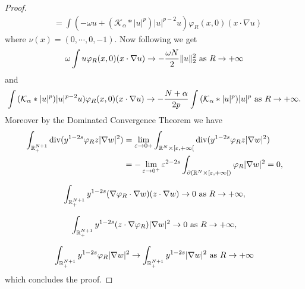 \documentclass[10pt]{amsart}
\numberwithin{equation}{section}
\begin{document}
\begin{proof}
\begin{align*}
	&=
	\int (-\omega u+ {{(\mathcal K_{\alpha}*|u|^{p})}} |u|^{p-2}u)\varphi_{R}(x,0)(x\cdot\nabla u)
	\end{align*}
	where $\nu(x)=(0,\cdots,0,-1)$. Now  following \cite[Proof of Proposition 3.1]{MV} we get
	\[
	\omega \int u \varphi_{R}(x,0)(x\cdot\nabla u)
	\to
	-\frac{\omega N}{2} \|u\|_2^2
	\hbox{ as } R\to +\infty
	\]
	and
	\[
	\int {{(\mathcal K_{\alpha}*|u|^{p})}} |u|^{p-2}u)\varphi_{R}(x,0)(x\cdot\nabla u)
	\to
	-\frac{N+\alpha}{2p} \int {{(\mathcal K_{\alpha}*|u|^{p})}} |u|^{p}
	\hbox{ as } R\to +\infty.
	\]
	Moreover by the Dominated Convergence Theorem we have
\begin{align*} 
\int_{\mathbb R^{N+1}_{+}} 
{\rm div}(y^{1-2s} \varphi_{ R} z |\nabla w|^{2})
&=
\lim_{\varepsilon\to 0+}
\int_{\mathbb R^{N}\times[\varepsilon,+\infty[} 
{\rm div}(y^{1-2s} \varphi_{ R} z |\nabla w|^{2})\\
&=
-\lim_{\varepsilon\to 0^{+}}
\varepsilon^{2-2s}
\int_{\partial({{\mathbb R}}^N\times[{\varepsilon},+\infty[)}
\varphi_{ R} |\nabla w|^{2} =0,
\end{align*}

\[
\int_{\mathbb R^{N+1}_{+}} 
y^{1-2s}(\nabla\varphi_{R}\cdot\nabla w)(z\cdot\nabla w)
\to 0
\hbox{ as } R\to +\infty,
\]

\[
\int_{\mathbb R^{N+1}_{+}} 
y^{1-2s}(z\cdot\nabla\varphi_{R})|\nabla w|^2
\to 0
\hbox{ as } R\to +\infty,
\]

\[
\int_{\mathbb R^{N+1}_{+}} 
y^{1-2s}\varphi_{R} |\nabla w|^2
\to 
\int_{\mathbb R^{N+1}_{+}} 
y^{1-2s} |\nabla w|^2
\hbox{ as } R\to +\infty
\]	
which concludes the proof.
\end{proof}
\end{document}
